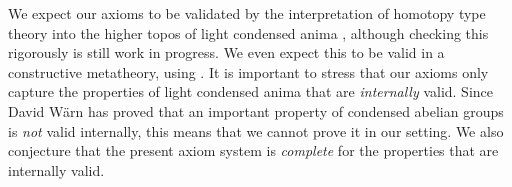 We expect our axioms to be validated by the interpretation of homotopy type theory into the higher topos of light condensed anima \cite{shulman2019all}, although checking this rigorously is still work in progress. We even expect this to be valid in a constructive metatheory, using \cite{CRS21}. It is important to stress that our axioms only capture the properties of light condensed anima that are {\em internally} valid. Since David W\"arn \cite{warn2024} has proved that an important property of condensed abelian groups is {\em not} valid internally, this means that we cannot prove it in our setting. We also conjecture that the present axiom system is {\em complete} for the properties that are internally valid.
